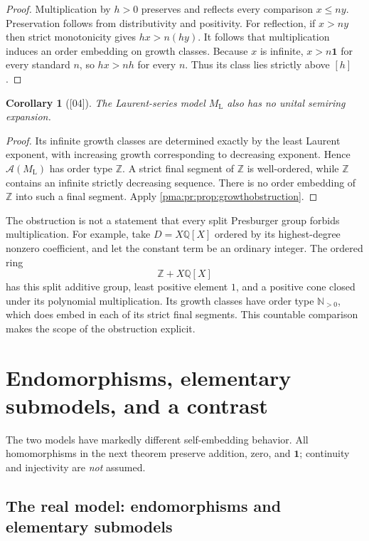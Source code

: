 \documentclass[11pt]{article}
\numberwithin{equation}{section}
\newtheorem{corollary}[corollary]{Corollary}
\theoremstyle{definition}
\theoremstyle{remark}
\newcommand{\N}{\mathbb N}
\newcommand{\Z}{\mathbb Z}
\newcommand{\Q}{\mathbb Q}
\newcommand{\one}{\mathbf 1}
\newcommand{\ML}{M_{\mathrm L}}
\newcommand{\src}[1]{\textup{\textsf{\small[#1]}}}
\begin{document}
\begin{proof}
Multiplication by $h>0$ preserves and reflects every comparison
$x\leq ny$. Preservation follows from distributivity and positivity.
For reflection, if $x>ny$ then strict monotonicity gives $hx>n(hy)$.
It follows that multiplication induces an order embedding on growth
classes. Because $x$ is infinite, $x>n\one$ for every standard $n$,
so $hx>nh$ for every $n$. Thus its class lies strictly above $[h]$.
\end{proof}

\begin{corollary}[\src{04}]\label{pma:pr:cor:laurentnoring}
The Laurent-series model $\ML$ also has no unital semiring expansion.
\end{corollary}

\begin{proof}
Its infinite growth classes are determined exactly by the least Laurent
exponent, with increasing growth corresponding to decreasing exponent.
Hence $\mathcal A(\ML)$ has order type $\Z$. A strict final segment of
$\Z$ is well-ordered, while $\Z$ contains an infinite strictly decreasing
sequence. There is no order embedding of $\Z$ into such a final segment.
Apply \cref{pma:pr:prop:growthobstruction}.
\end{proof}

The obstruction is not a statement that every split Presburger group
forbids multiplication. For example, take $D=X\Q[X]$ ordered by its
highest-degree nonzero coefficient, and let the constant term be an
ordinary integer. The ordered ring
\[
 \Z+X\Q[X]
\]
has this split additive group, least positive element $1$, and a positive
cone closed under its polynomial multiplication. Its growth classes have
order type $\N_{>0}$, which does embed in each of its strict final
segments. This countable comparison makes the scope of the obstruction
explicit.

\section{Endomorphisms, elementary submodels, and a contrast}
\label{pma:pr:sec:embeddings}\label{pma:pr:s04:sec:embeddings}

The two models have markedly different self-embedding behavior. All
homomorphisms in the next theorem preserve addition, zero, and $\one$;
continuity and injectivity are \emph{not} assumed.

\subsection{The real model: endomorphisms and elementary submodels}\label{pma:pr:sec:realendos}
\end{document}
